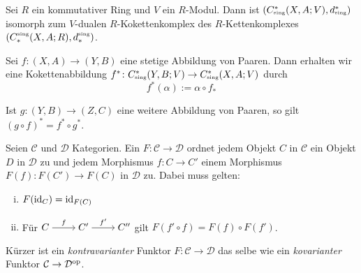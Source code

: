 \begin{bemerkung}
	Sei $R$ ein kommutativer Ring und $V$ ein $R$-Modul. Dann ist
	\(
		\enbrace*{C^*_\sing(X,A;V), d^*_\sing}
	\)
	isomorph zum $V$-dualen $R$-Kokettenkomplex des $R$-Kettenkomplexes $\enbrace*{C^\sing_*(X,A;R), d^\sing_*}$.
\end{bemerkung}


\begin{definition}[{name=[induzierte Abbildung auf Kokettenkomplexen]}]
	Sei $f \colon (X,A) \to (Y,B)$ eine stetige Abbildung von Paaren. Dann erhalten wir eine Kokettenabbildung $f^* \colon C^*_\sing(Y,B;V) \to C^*_\sing(X,A;V)$ durch
	\[
		f^*(\alpha) := \alpha \circ f_*
	\]
\end{definition}

\begin{bemerkung}
	Ist $g \colon (Y,B) \to (Z,C)$ eine weitere Abbildung von Paaren, so gilt $(g \circ f)^* = f^* \circ g^*$.
\end{bemerkung}

\begin{definition}[{name=[kontravarianter Funktor]}]
	Seien $\mathcal{C}$ und $\mathcal{D}$ Kategorien. Ein   $F \colon \mathcal{C} \to \mathcal{D}$ ordnet jedem Objekt $C$ in $\mathcal{C}$ ein Objekt
	$D$ in $\mathcal{D}$ zu und jedem Morphismus $f \colon C \to C'$ einem Morphismus $F(f) \colon F(C') \to F(C)$ in $\mathcal{D}$ zu. Dabei muss gelten:
	\begin{enumerate}[i),noitemsep]
		\item $F(\operatorname{id}_C)= \operatorname{id}_{F(C)}$
		\item Für $\begin{tikzcd}[cramped] C \rar["f"] & C' \rar["f'"] & C'' \end{tikzcd}$ gilt $F(f' \circ f) = F(f) \circ F(f')$. 
	\end{enumerate}
	Kürzer ist ein \emph{kontravarianter} Funktor $F \colon \mathcal{C} \to \mathcal{D}$ das selbe wie ein \emph{kovarianter} Funktor 
	$\mathcal{C} \to \mathcal{D}^{\mathrm{op}}$.
\end{definition}

